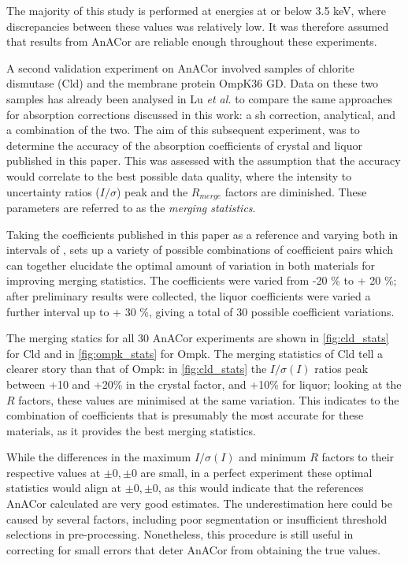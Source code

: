 The majority of this study is performed at energies at or below 3.5 \unit{keV}, where discrepancies between these values was relatively low. It was therefore assumed that results from AnACor are reliable enough throughout these experiments. 

A second validation experiment on AnACor involved samples of chlorite dismutase (Cld) and the membrane protein OmpK36 GD. Data on these two samples has already been analysed in Lu \textit{et al.} \cite{Lu2024} to compare the same approaches for absorption corrections discussed in this work: a \ac{sh} correction, analytical, and a combination of the two. The aim of this subsequent experiment, was to determine the accuracy of the absorption coefficients of crystal and liquor published in this paper. This was assessed with the assumption that the accuracy would correlate to the best possible data quality, where the intensity to uncertainty ratios ($I / \sigma$) peak and the $R_{merge}$ factors are diminished. These parameters are referred to as the \textit{merging statistics}.

Taking the coefficients published in this paper as a reference and varying both in intervals of , sets up a variety of possible combinations of coefficient pairs which can together elucidate the optimal amount of variation in both materials for improving merging statistics. The coefficients were varied from -20 \% to + 20 \%; after preliminary results were collected, the liquor coefficients were varied a further interval up to + 30 \%, giving a total of 30 possible coefficient variations. %

The merging statics for all 30 AnACor experiments are shown in \cref{fig:cld_stats} for Cld and in \cref{fig:ompk_stats} for Ompk. The merging statistics of Cld tell a clearer story than that of Ompk: in \cref{fig:cld_stats} the $I/\sigma(I)$ ratios peak between +10 and +20\% in the crystal factor, and +10\% for liquor; looking at the $R$ factors, these values are minimised at the same variation. This indicates to the combination of coefficients that is presumably the most accurate for these materials, as it provides the best merging statistics.

While the differences in the maximum $I/\sigma(I)$ and minimum $R$ factors to their respective values at $\pm0,\pm0$ are small, in a perfect experiment these optimal statistics would align at $\pm0,\pm0$, as this would indicate that the references AnACor calculated are very good estimates. The underestimation here could be caused by several factors, including poor segmentation or insufficient threshold selections in pre-processing. Nonetheless, this procedure is still useful in correcting for small errors that deter AnACor from obtaining the true values. 

